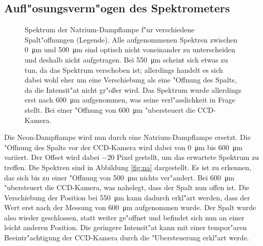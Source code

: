 \subsection{Aufl"osungsverm"ogen des Spektrometers}
\begin{figure}[htbp]
    \centering
    
    \caption{
        Spektrum der Natrium-Dampflampe f"ur verschiedene Spalt"offnungen (Legende).
        Alle aufgenommenen Spektren zwischen \SI{0}{\micro\metre} und \SI{500}{\micro\metre} sind optisch nicht voneinander zu unterscheiden und deshalb nicht aufgetragen.
        Bei \SI{550}{\micro\metre} scheint sich etwas zu tun, da das Spektrum verschoben ist; allerdings handelt es sich dabei wohl eher um eine Verschiebung als eine "Offnung des Spalts, da die Intensit"at nicht gr"o\ss er wird.
        Das Spektrum wurde allerdings erst nach \SI{600}{\micro\metre} aufgenommen, was seine verl"asslichkeit in Frage stellt.
        Bei einer "Offnung von \SI{600}{\micro\metre} "ubersteuert die CCD-Kamera.
    }
    \label{fig:na}
\end{figure}
Die Neon-Dampflampe wird nun durch eine Natrium-Dampflampe ersetzt.
Die "Offnung des Spalts vor der CCD-Kamera wird dabei von \SI{0}{\micro\metre} bis \SI{600}{\micro\metre} variiert.
Der Offset wird dabei $-20$ Pixel gestellt, um das erwartete Spektrum zu treffen.
Die Spektren sind in Abbildung \vref{fig:na} dargestellt.
Es ist zu erkennen, das sich bis zu einer "Offnung von \SI{500}{\micro\metre} nichts ver"andert.
Bei \SI{600}{\micro\metre} "ubersteuert die CCD-Kamera, was nahelegt, dass der Spalt nun offen ist.
Die Verschiebung der Position bei \SI{550}{\micro\metre} kann dadurch erkl"art werden, dass der Wert erst nach der Messung von \SI{600}{\micro\metre} aufgenommen wurde.
Der Spalt wurde also wieder geschlossen, statt weiter ge"offnet und befindet sich nun an einer leicht anderen Position.
Die geringere Intensit"at kann mit einer tempor"aren Beeintr"achtigung der CCD-Kamera durch die "Ubersteuerung erkl"art werde.